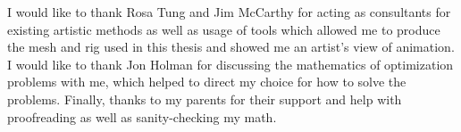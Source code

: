  
I would like to thank Rosa Tung and Jim McCarthy for acting as consultants for existing artistic methods as well as usage of tools which allowed me to produce the mesh and rig used in this thesis and showed me an artist's view of animation.  I would like to thank Jon Holman for discussing the mathematics of optimization problems with me, which helped to direct my choice for how to solve the problems.  Finally, thanks to my parents for their support and help with proofreading as well as sanity-checking my math.